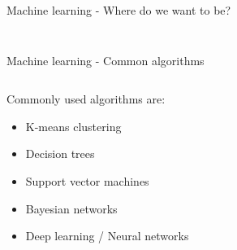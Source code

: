 \documentclass[10pt]{beamer}
\begin{document}
\begin{frame}{Machine learning - Where do we want to be?}
\begin{columns}
\begin{column}{0.5\textwidth}
{\begin{figure}
		\end{figure}}
	\end{column}
\end{columns}
\end{frame}

\begin{frame}{Machine learning - Common algorithms}
	\begin{columns}
		\begin{column}{0.5\textwidth}
			Commonly used algorithms are:
			\begin{itemize}
				\item<2-> K-means clustering
				\item<3-> Decision trees
				\item<4-> Support vector machines
				\item<5-> Bayesian networks
				\item<6-> \alert{Deep learning / Neural networks}
			\end{itemize}
		\end{column}
		\begin{column}{0.5\textwidth}
			\begin{figure}
				\begin{subfigure}{.5\textwidth}
					\centering
				\end{subfigure}%
				\begin{subfigure}{.5\textwidth}
					\centering

\end{subfigure}
\end{figure}
\end{column}
\end{columns}
\end{frame}
\end{document}
